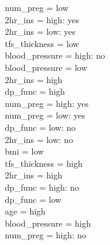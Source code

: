\documentclass[12pt]{article}
\begin{document}
\textbar\quad \textbar\quad \textbar\quad \textbar\quad \textbar\quad \textbar\quad num\_preg = low\\
\textbar\quad \textbar\quad \textbar\quad \textbar\quad \textbar\quad \textbar\quad \textbar\quad 2hr\_ins = high: yes\\
\textbar\quad \textbar\quad \textbar\quad \textbar\quad \textbar\quad \textbar\quad \textbar\quad 2hr\_ins = low: yes\\
\textbar\quad \textbar\quad \textbar\quad tfs\_thickness = low\\
\textbar\quad \textbar\quad \textbar\quad \textbar\quad blood\_pressure = high: no\\
\textbar\quad \textbar\quad \textbar\quad \textbar\quad blood\_pressure = low\\
\textbar\quad \textbar\quad \textbar\quad \textbar\quad \textbar\quad 2hr\_ins = high\\
\textbar\quad \textbar\quad \textbar\quad \textbar\quad \textbar\quad \textbar\quad dp\_func = high\\
\textbar\quad \textbar\quad \textbar\quad \textbar\quad \textbar\quad \textbar\quad \textbar\quad num\_preg = high: yes\\
\textbar\quad \textbar\quad \textbar\quad \textbar\quad \textbar\quad \textbar\quad \textbar\quad num\_preg = low: yes\\
\textbar\quad \textbar\quad \textbar\quad \textbar\quad \textbar\quad \textbar\quad dp\_func = low: no\\
\textbar\quad \textbar\quad \textbar\quad \textbar\quad \textbar\quad 2hr\_ins = low: no\\
\textbar\quad bmi = low\\
\textbar\quad \textbar\quad tfs\_thickness = high\\
\textbar\quad \textbar\quad \textbar\quad 2hr\_ins = high\\
\textbar\quad \textbar\quad \textbar\quad \textbar\quad dp\_func = high: no\\
\textbar\quad \textbar\quad \textbar\quad \textbar\quad dp\_func = low\\
\textbar\quad \textbar\quad \textbar\quad \textbar\quad \textbar\quad age = high\\
\textbar\quad \textbar\quad \textbar\quad \textbar\quad \textbar\quad \textbar\quad blood\_pressure = high\\
\textbar\quad \textbar\quad \textbar\quad \textbar\quad \textbar\quad \textbar\quad \textbar\quad num\_preg = high: no\\
\end{document}
